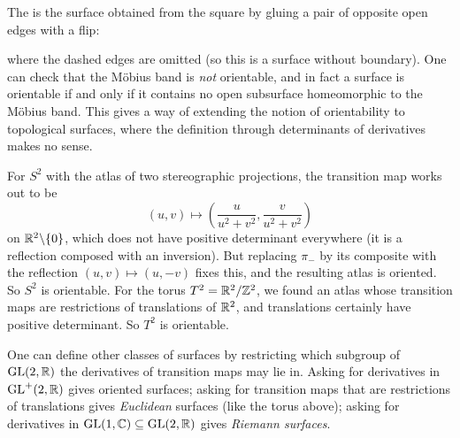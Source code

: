 \documentclass[a4paper]{scrartcl}
\begin{document}
\begin{example}
    The  is the surface obtained from the square by gluing a pair of opposite open edges with a flip:
    \begin{center}
    \end{center}
    where the dashed edges are omitted (so this is a surface without boundary). One can check that the M\"obius band is \emph{not} orientable, and in fact a surface is orientable if and only if it contains no open subsurface homeomorphic to the M\"obius band. This gives a way of extending the notion of orientability to topological surfaces, where the definition through determinants of derivatives makes no sense.
\end{example}

\begin{example}
    For $S^2$ with the atlas of two stereographic projections, the transition map works out to be
    $$
    (u, v) \mapsto \left(\frac{u}{u^2 + v^2}, \frac{v}{u^2 + v^2}\right)
    $$
    on $\mathbb{R}^2 \backslash \{0\}$, which does not have positive determinant everywhere (it is a reflection composed with an inversion). But replacing $\pi_-$ by its composite with the reflection $(u,v) \mapsto (u, -v)$ fixes this, and the resulting atlas is oriented. So $S^2$ is orientable.
    For the torus $T^2 = \mathbb{R}^2/\mathbb{Z}^2$, we found an atlas whose transition maps are restrictions of translations of $\mathbb{R}^2$, and translations certainly have positive determinant. So $T^2$ is orientable.
\end{example}

\begin{remark}
    One can define other classes of surfaces by restricting which subgroup of $\operatorname{GL}(2, \mathbb{R})$ the derivatives of transition maps may lie in. Asking for derivatives in $\operatorname{GL}^+(2, \mathbb{R})$ gives oriented surfaces; asking for transition maps that are restrictions of translations gives \emph{Euclidean} surfaces (like the torus above); asking for derivatives in $\operatorname{GL}(1, \mathbb{C}) \subseteq \operatorname{GL}(2, \mathbb{R})$ gives \emph{Riemann surfaces}.
\end{remark}
\end{document}
